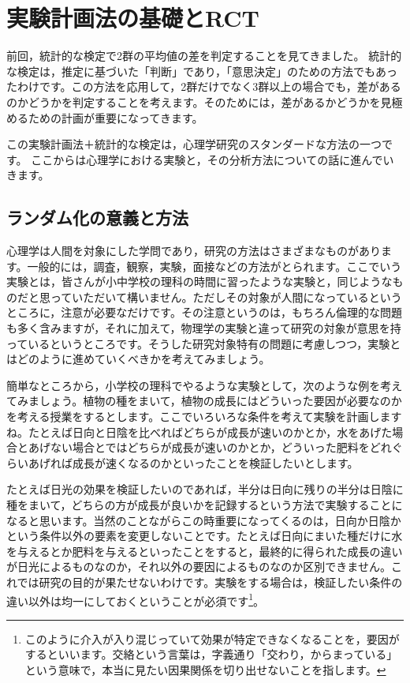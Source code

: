 \documentclass{ltjbook}
\begin{document}
\chapter{実験計画法の基礎とRCT}
\label{ch17_RCT}

前回，統計的な検定で2群の平均値の差を判定することを見てきました。
統計的な検定は，推定に基づいた「判断」であり，「意思決定」のための方法でもあったわけです。この方法を応用して，2群だけでなく3群以上の場合でも，差があるのかどうかを判定することを考えます。そのためには，差があるかどうかを見極めるための計画が重要になってきます。

この実験計画法＋統計的な検定は，心理学研究のスタンダードな方法の一つです。
ここからは心理学における実験と，その分析方法についての話に進んでいきます。


\section{ランダム化の意義と方法}
\label{RCT}
心理学は人間を対象にした学問であり，研究の方法はさまざまなものがあります。一般的には，調査，観察，実験，面接などの方法がとられます。ここでいう実験とは，皆さんが小中学校の理科の時間に習ったような実験と，同じようなものだと思っていただいて構いません。ただしその対象が人間になっているというところに，注意が必要なだけです。その注意というのは，もちろん倫理的な問題も多く含みますが，それに加えて，物理学の実験と違って研究の対象が意思を持っているというところです。そうした研究対象特有の問題に考慮しつつ，実験とはどのように進めていくべきかを考えてみましょう。

簡単なところから，小学校の理科でやるような実験として，次のような例を考えてみましょう。植物の種をまいて，植物の成長にはどういった要因が必要なのかを考える授業をするとします。ここでいろいろな条件を考えて実験を計画しますね。たとえば日向と日陰を比べればどちらが成長が速いのかとか，水をあげた場合とあげない場合とではどちらが成長が速いのかとか，どういった肥料をどれぐらいあげれば成長が速くなるのかといったことを検証したいとします。

たとえば日光の効果を検証したいのであれば，半分は日向に残りの半分は日陰に種をまいて，どちらの方が成長が良いかを記録するという方法で実験することになると思います。当然のことながらこの時重要になってくるのは，日向か日陰かという条件以外の要素を変更しないことです。たとえば日向にまいた種だけに水を与えるとか肥料を与えるといったことをすると，最終的に得られた成長の違いが日光によるものなのか，それ以外の要因によるものなのか区別できません。これでは研究の目的が果たせないわけです。実験をする場合は，検証したい条件の違い以外は均一にしておくということが必須です\footnote{このように介入が入り混じっていて効果が特定できなくなることを，要因がするといいます。交絡という言葉は，字義通り「交わり，からまっている」という意味で，本当に見たい因果関係を切り出せないことを指します。}。
\end{document}

